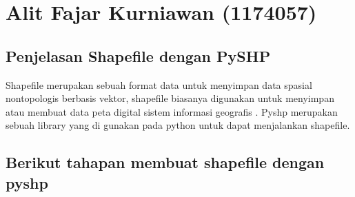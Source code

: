 \section{Alit Fajar Kurniawan (1174057)}
\subsection{Penjelasan Shapefile dengan PySHP}
Shapefile merupakan sebuah format data untuk menyimpan data spasial nontopologis berbasis vektor, shapefile biasanya digunakan untuk menyimpan atau membuat data peta digital sistem informasi geografis \cite{clark2018britice}. \hfill\break
Pyshp merupakan sebuah library yang di gunakan pada python untuk dapat menjalankan shapefile. \hfill\break

\subsection{Berikut tahapan membuat shapefile dengan pyshp}
